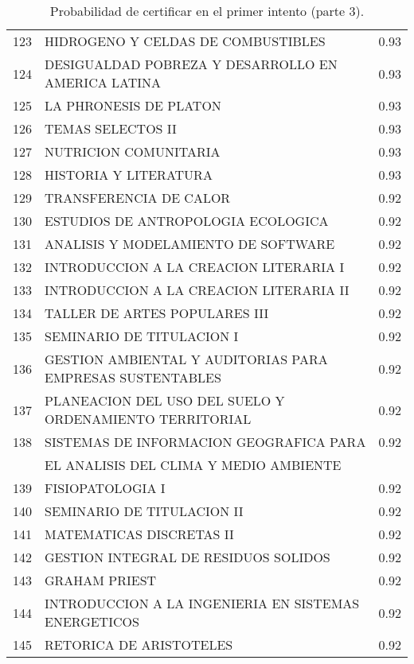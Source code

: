 \documentclass[12pt]{article}
\begin{document}
\begin{table}[ht]
{\begin{tabular}{rlr}
  123 & HIDROGENO Y CELDAS DE COMBUSTIBLES & 0.93 \\ 
  124 & DESIGUALDAD POBREZA Y DESARROLLO EN AMERICA LATINA & 0.93 \\ 
  125 & LA PHRONESIS DE PLATON & 0.93 \\ 
  126 & TEMAS SELECTOS II & 0.93 \\ 
  127 & NUTRICION COMUNITARIA & 0.93 \\ 
  128 & HISTORIA Y LITERATURA & 0.93 \\ 
  129 & TRANSFERENCIA DE CALOR & 0.92 \\ 
  130 & ESTUDIOS DE ANTROPOLOGIA ECOLOGICA & 0.92 \\ 
  131 & ANALISIS Y MODELAMIENTO DE SOFTWARE & 0.92 \\ 
  132 & INTRODUCCION A LA CREACION LITERARIA I & 0.92 \\ 
  133 & INTRODUCCION A LA CREACION LITERARIA II & 0.92 \\ 
  134 & TALLER DE ARTES POPULARES III & 0.92 \\ 
  135 & SEMINARIO DE TITULACION I & 0.92 \\ 
  136 & GESTION AMBIENTAL Y AUDITORIAS PARA EMPRESAS SUSTENTABLES & 0.92 \\ 
  137 & PLANEACION DEL USO DEL SUELO Y ORDENAMIENTO TERRITORIAL & 0.92 \\ 
  138 & SISTEMAS DE INFORMACION GEOGRAFICA PARA  & 0.92 \\ 
  & EL ANALISIS DEL CLIMA Y MEDIO AMBIENTE & \\ 
 139 & FISIOPATOLOGIA I & 0.92 \\ 
  140 & SEMINARIO DE TITULACION II & 0.92 \\ 
  141 & MATEMATICAS DISCRETAS II & 0.92 \\ 
  142 & GESTION INTEGRAL DE RESIDUOS SOLIDOS & 0.92 \\ 
  143 & GRAHAM PRIEST & 0.92 \\ 
  144 & INTRODUCCION A LA INGENIERIA EN SISTEMAS ENERGETICOS & 0.92 \\ 
  145 & RETORICA DE ARISTOTELES & 0.92 \\ 
     \hline
\end{tabular}
}
\caption{\label{Prob_Cert_Intento_3}Probabilidad de certificar en el primer intento (parte 3).}

\end{table}
\end{document}
